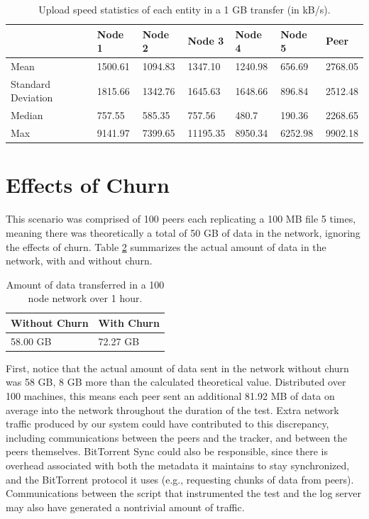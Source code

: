 \documentclass[12pt]{report}
\begin{document}
\begin{table}
\begin{adjustwidth}{-.5in}{-.5in}
\centering
    \begin{tabular}{| l | l | l | l | l | l | l |}
    \hline
    & Node 1 & Node 2 & Node 3 & Node 4 & Node 5 & Peer \\ \hline
    Mean & 1500.61 & 1094.83 & 1347.10 & 1240.98 & 656.69 & 2768.05\\ \hline
    Standard Deviation & 1815.66 & 1342.76 & 1645.63 & 1648.66 & 896.84 & 2512.48 \\ \hline
    Median & 757.55 & 585.35 & 757.56 & 480.7 & 190.36 & 2268.65 \\ \hline
    Max & 9141.97 & 7399.65 & 11195.35 & 8950.34 & 6252.98 & 9902.18 \\ \hline
    \end{tabular}
\end{adjustwidth}
    \caption{Upload speed statistics of each entity in a 1 GB transfer (in kB/s). \label{tab:UploadBackupSpeed}}
\end{table}

\section{Effects of Churn} \label{sec:EffectsofChurn_chap:Results}

This scenario was comprised of 100 peers each replicating a 100 MB file 5 times, meaning there was theoretically a total of 50 GB of data in the network, ignoring the effects of churn. Table \ref{tab:ChurnBandwidth} summarizes the actual amount of data in the network, with and without churn.

\begin{table}
\begin{center}
    \begin{tabular}{| l | l |}
    \hline
    Without Churn & With Churn \\ \hline
    58.00 GB & 72.27 GB\\ \hline
    \end{tabular}
    \caption{Amount of data transferred in a 100 node network over 1 hour.}
    \label{tab:ChurnBandwidth}
\end{center}
\end{table}

First, notice that the actual amount of data sent in the network without churn was 58 GB, 8 GB more than the calculated theoretical value. Distributed over 100 machines, this means each peer sent an additional 81.92 MB of data on average into the network throughout the duration of the test. Extra network traffic produced by our system could have contributed to this discrepancy, including communications between the peers and the tracker, and between the peers themselves. BitTorrent Sync could also be responsible, since there is overhead associated with both the metadata it maintains to stay synchronized, and the BitTorrent protocol it uses (e.g., requesting chunks of data from peers). Communications between the script that instrumented the test and the log server may also have generated a nontrivial amount of traffic.
\end{document}
